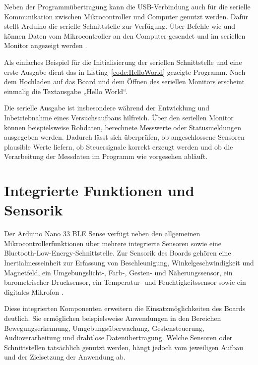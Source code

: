 Neben der Programmübertragung kann die USB-Verbindung auch für die serielle Kommunikation zwischen Mikrocontroller und Computer genutzt werden. Dafür stellt Arduino die serielle Schnittstelle zur Verfügung. Über Befehle wie  und  können Daten vom Mikrocontroller an den Computer gesendet und im seriellen Monitor angezeigt werden \cite{ArduinoGS:2026}.

Als einfaches Beispiel für die Initialisierung der seriellen Schnittstelle und eine erste Ausgabe dient das in Listing~\ref{code:HelloWorld} gezeigte Programm. Nach dem Hochladen auf das Board und dem Öffnen des seriellen Monitors erscheint einmalig die Textausgabe „Hello World“.

 \begin{center}
 	 \label{code:HelloWorld}  
 \end{center}
 
Die serielle Ausgabe ist insbesondere während der Entwicklung und Inbetriebnahme eines Versuchsaufbaus hilfreich. Über den seriellen Monitor können beispielsweise Rohdaten, berechnete Messwerte oder Statusmeldungen ausgegeben werden. Dadurch lässt sich überprüfen, ob angeschlossene Sensoren plausible Werte liefern, ob Steuersignale korrekt erzeugt werden und ob die Verarbeitung der Messdaten im Programm wie vorgesehen abläuft.



\section{Integrierte Funktionen und Sensorik}

Der Arduino Nano 33 BLE Sense verfügt neben den allgemeinen Mikrocontrollerfunktionen über mehrere integrierte Sensoren sowie eine Bluetooth-Low-Energy-Schnittstelle. Zur Sensorik des Boards gehören eine Inertialmesseinheit zur Erfassung von Beschleunigung, Winkelgeschwindigkeit und Magnetfeld, ein Umgebungslicht-, Farb-, Gesten- und Näherungssensor, ein barometrischer Drucksensor, ein Temperatur- und Feuchtigkeitssensor sowie ein digitales Mikrofon \cite{ArduinoNano:2026}.


Diese integrierten Komponenten erweitern die Einsatzmöglichkeiten des Boards deutlich. Sie ermöglichen beispielsweise Anwendungen in den Bereichen Bewegungserkennung, Umgebungsüberwachung, Gestensteuerung, Audioverarbeitung und drahtlose Datenübertragung. Welche Sensoren oder Schnittstellen tatsächlich genutzt werden, hängt jedoch vom jeweiligen Aufbau und der Zielsetzung der Anwendung ab.



